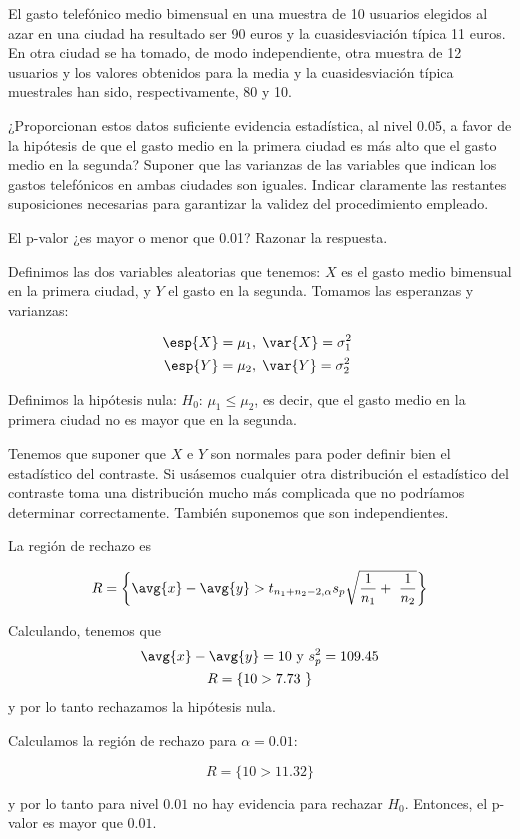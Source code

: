 \begin{problem}[5]
El gasto telefónico medio bimensual en una muestra de 10 usuarios elegidos al azar en una ciudad ha resultado ser 90 euros y la cuasidesviación típica 11 euros. En otra ciudad se ha tomado, de modo independiente, otra muestra de 12 usuarios y los valores obtenidos para la media y la cuasidesviación típica muestrales han sido, respectivamente, 80 y 10.

\ppart ¿Proporcionan estos datos suficiente evidencia estadística, al nivel 0.05, a favor de la hipótesis  de que el gasto medio en la primera ciudad es más alto que el gasto medio en la segunda? Suponer que las varianzas de las variables que indican los gastos telefónicos en ambas ciudades son iguales. Indicar claramente las restantes suposiciones necesarias para garantizar la validez del procedimiento empleado.

\ppart El p-valor ¿es mayor o menor que 0.01? Razonar la respuesta.

\solution

\spart Definimos las dos variables aleatorias que tenemos: $X$ es el gasto medio bimensual en la primera ciudad, y $Y$ el gasto en la segunda. Tomamos las esperanzas y varianzas:

\begin{gather*}
\esp{X} = \mu_1,\;\var{X} = \sigma_1^2 \\
\esp{Y} = \mu_2,\;\var{Y} = \sigma_2^2 
\end{gather*}

 Definimos la hipótesis nula: $H_0:\, \mu_1\leq\mu_2$, es decir, que el gasto medio en la primera ciudad no es mayor que en la segunda.
 
 Tenemos que suponer que $X$ e $Y$ son normales para poder definir bien el estadístico del contraste. Si usásemos cualquier otra distribución el estadístico del contraste toma una distribución mucho más complicada que no podríamos determinar correctamente. También suponemos que son independientes.                       

La región de rechazo es 

\[ R = \left\{ \avg{x} - \avg{y} > t_{n_1+n_2-2, \alpha} s_p\sqrt{\frac{1}{n_1} + \frac{1}{n_2}}\right\} \] 

Calculando, tenemos que 
\begin{gather*}
\avg{x}-\avg{y} = 10 \text{ y } s_p^2 = 109.45 \\
R = \{10 > 7.73 \}
\end{gather*}
y por lo tanto rechazamos la hipótesis nula.

\spart Calculamos la región de rechazo para $\alpha=0.01$:

\[ R= \{10 > 11.32 \} \]

y por lo tanto para nivel $0.01$ no hay evidencia para rechazar $H_0$. Entonces, el p-valor es mayor que $0.01$.

\end{problem}


